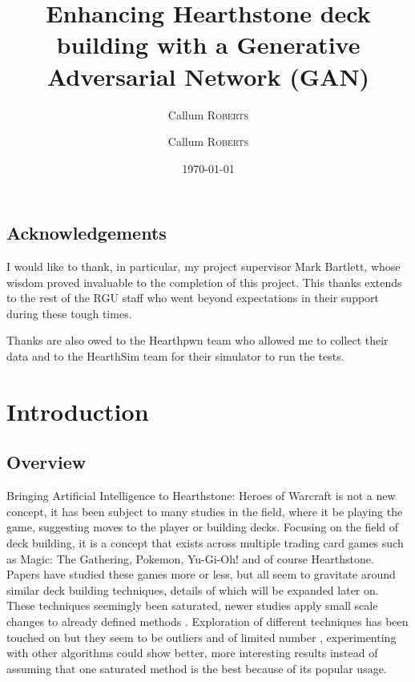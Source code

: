 \documentclass{report} %
\title{Enhancing Hearthstone deck building with a Generative Adversarial Network (GAN)} %
\author{Callum \textsc{Roberts}} %
\author{Callum \textsc{Roberts}} %
\date{\today} %
\begin{document}
\maketitle %


\begin{abstract}

\end{abstract}

\section*{Acknowledgements}
I would like to thank, in particular, my project supervisor Mark Bartlett, whose wisdom proved invaluable to the completion of this project. This thanks extends to the rest of the RGU staff who went beyond expectations in their support during these tough times.

Thanks are also owed to the Hearthpwn team who allowed me to collect their data and to the HearthSim team for their simulator to run the tests.


\tableofcontents

\chapter{Introduction}
\section{Overview}
Bringing Artificial Intelligence to Hearthstone: Heroes of Warcraft is not a new concept, it has been subject to many studies in the field, where it be playing the game, suggesting moves to the player or building decks. Focusing on the field of deck building, it is a concept that exists across multiple trading card games such as Magic: The Gathering, Pokemon, Yu-Gi-Oh! and of course Hearthstone. Papers have studied these games more or less, but all seem to gravitate around similar deck building techniques, details of which will be expanded later on. These techniques seemingly been saturated, newer studies apply small scale changes to already defined methods \cite{Back1996}. Exploration of different techniques has been touched on but they seem to be outliers and of limited number \cite{Ward2020}, experimenting with other algorithms could show better, more  interesting results instead of assuming that one saturated method is the best because of its popular usage.
\end{document}
